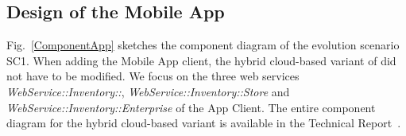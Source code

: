 %


\newpage

\subsection{Design of the Mobile App}\label{DesignMobileApp}
Fig.~\ref{ComponentApp} sketches the component diagram of the evolution scenario SC1. 
When adding the Mobile App client, the hybrid cloud-based variant of \CoCoME did not have to be modified. 
We focus on the three web services \textit{WebService::Inventory::}, \textit{WebService::Inventory::Store} and \textit{WebService::Inventory::Enterprise} of the App Client.
The entire component diagram for the hybrid cloud-based variant is available in the  Technical Report~\cite{HeinrichRostamiReussner2016_1000052688}. 

